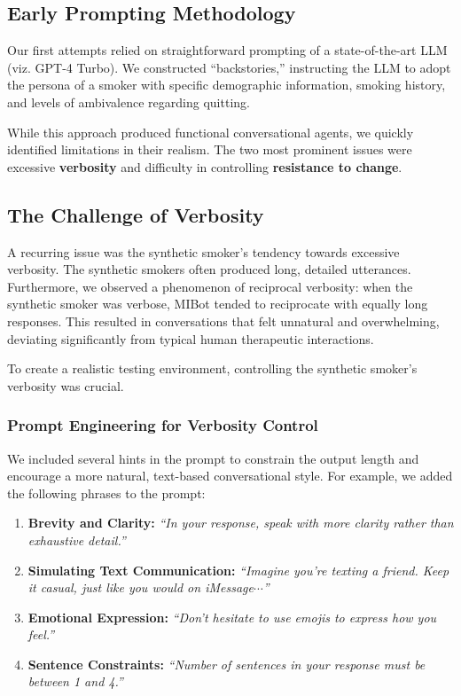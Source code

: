 \subsection{Early Prompting Methodology}
Our first attempts relied on straightforward prompting of a state-of-the-art LLM (viz. GPT-4 Turbo). We constructed ``backstories,'' instructing the LLM to adopt the persona of a smoker with specific demographic information, smoking history, and levels of ambivalence regarding quitting.


While this approach produced functional conversational agents, we quickly identified limitations in their realism. The two most prominent issues were excessive \textbf{verbosity} and difficulty in controlling \textbf{resistance to change}.

\subsection{The Challenge of Verbosity}
A recurring issue was the synthetic smoker's tendency towards excessive verbosity. The synthetic smokers often produced long, detailed utterances. Furthermore, we observed a phenomenon of reciprocal verbosity: when the synthetic smoker was verbose, MIBot tended to reciprocate with equally long responses. This resulted in conversations that felt unnatural and overwhelming, deviating significantly from typical human therapeutic interactions.

To create a realistic testing environment, controlling the synthetic smoker's verbosity was crucial.

\subsubsection*{Prompt Engineering for Verbosity Control}
We included several hints in the prompt to constrain the output length and encourage a more natural, text-based conversational style. For example, we added the following phrases to the prompt:

\begin{enumerate}
    \item \textbf{Brevity and Clarity:} \textit{``In your response, speak with more clarity rather than exhaustive detail.''}

    \item \textbf{Simulating Text Communication:} \textit{``Imagine you're texting a friend. Keep it casual, just like you would on iMessage$\cdots$''}

    \item \textbf{Emotional Expression:} \textit{``Don't hesitate to use emojis to express how you feel.''}

    \item \textbf{Sentence Constraints:} \textit{``Number of sentences in your response must be between 1 and 4.''}
\end{enumerate}

